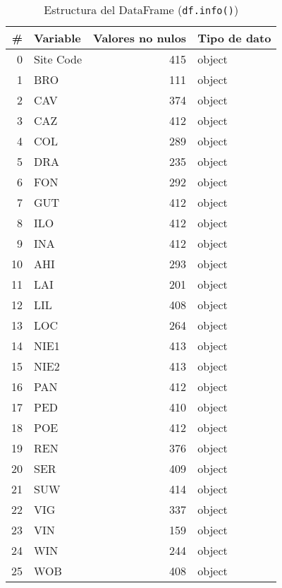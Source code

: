 \documentclass[a4paper,11pt]{article}
\begin{document}
\begin{table}[H]
    \centering
    \caption{Estructura del DataFrame (\texttt{df.info()})}
    \label{tab:info}
    \begin{tabular}{|r|l|r|l|}
        \hline
        \# & Variable & Valores no nulos & Tipo de dato \\
        \hline
        0   & Site Code & 415 & object \\
        1   & BRO       & 111 & object \\
        2   & CAV       & 374 & object \\
        3   & CAZ       & 412 & object \\
        4   & COL       & 289 & object \\
        5   & DRA       & 235 & object \\
        6   & FON       & 292 & object \\
        7   & GUT       & 412 & object \\
        8   & ILO       & 412 & object \\
        9   & INA       & 412 & object \\
        10  & AHI       & 293 & object \\
        11  & LAI       & 201 & object \\
        12  & LIL       & 408 & object \\
        13  & LOC       & 264 & object \\
        14  & NIE1      & 413 & object \\
        15  & NIE2      & 413 & object \\
        16  & PAN       & 412 & object \\
        17  & PED       & 410 & object \\
        18  & POE       & 412 & object \\
        19  & REN       & 376 & object \\
        20  & SER       & 409 & object \\
        21  & SUW       & 414 & object \\
        22  & VIG       & 337 & object \\
        23  & VIN       & 159 & object \\
        24  & WIN       & 244 & object \\
        25  & WOB       & 408 & object \\
        \hline
    \end{tabular}
\end{table}
\end{document}
